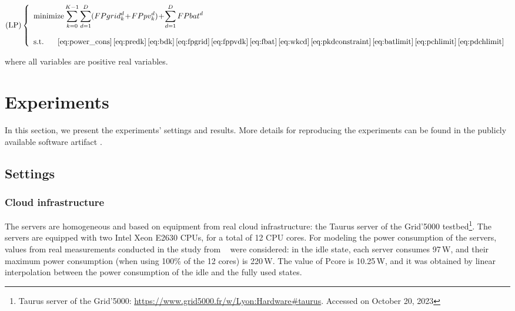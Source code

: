 \begin{equation}\nonumber
    \text{(LP)}\left\{
    \begin{array}{ll}
        \text{minimize}\displaystyle\sum_{k=0}^{K-1}\sum_{d=1}^D (FPgrid^d_k\!+\!FPpv^d_k)\!+\!\sum_{d=1}^D FPbat^d \label{eq:lp}\\ \\
        \text{s.t. } \ \ \ \ 
\eqref{eq:power_cons}\,\eqref{eq:predk}\,\eqref{eq:bdk}\,\eqref{eq:fpgrid}\,\eqref{eq:fppvdk}\,\eqref{eq:fbat}\,\eqref{eq:wkcd}\,\eqref{eq:pkdconstraint}\,\eqref{eq:batlimit}\,\eqref{eq:pchlimit}\,\eqref{eq:pdchlimit} %
    \end{array}
    \right.
\end{equation}

where all variables are positive real variables. 


\section{Experiments}
\label{sec:experiments_ccgrid}

In this section, we present the experiments' settings and results.  More details for reproducing the experiments can be found in the publicly available software artifact \cite{artifact_ccgrid}. 

\subsection{Settings}


\label{sec:settings_ccgrid}


\subsubsection{Cloud infrastructure}

The servers are homogeneous and based on equipment from real cloud infrastructure: the Taurus server of the Grid'5000 testbed\footnote{Taurus server of the Grid'5000: \url{https://www.grid5000.fr/w/Lyon:Hardware\#taurus}. Accessed on October 20, 2023}. The servers are equipped with two Intel Xeon E2630 CPUs, for a total of 12 CPU cores. For modeling the power consumption of the servers, values from real measurements conducted in the study from ~\citet{ahvar22_estimating_cloud_cons} were considered: in the idle state, each server consumes 97\,W, and their maximum power consumption (when using 100\% of the 12 cores) is 220\,W. The value of Pcore is 10.25\,W, and it was obtained by linear interpolation between the power consumption of the idle and the fully used states.

